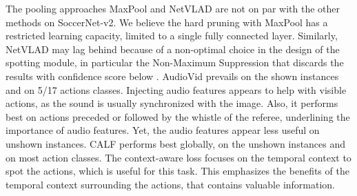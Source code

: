 \documentclass[final]{cvsports}
\begin{document}
The pooling approaches MaxPool and NetVLAD are not on par with the other methods on SoccerNet-v2. We believe the hard pruning with MaxPool has a restricted learning capacity, limited to a single fully connected layer. Similarly, NetVLAD may lag behind because of a non-optimal choice in the design of the spotting module, in particular the Non-Maximum Suppression that discards the results with confidence score below . AudioVid prevails on the shown instances and on 5/17 actions classes. Injecting audio features appears to help with visible actions, as the sound is usually synchronized with the image. Also, it performs best on actions preceded or followed by the whistle of the referee, underlining the importance of audio features. Yet, the audio features appear less useful on unshown instances. 
CALF performs best globally, on the unshown instances and on most action classes. The context-aware loss focuses on the temporal context to spot the actions, which is useful for this task. This emphasizes the benefits of the temporal context surrounding the actions, that contains valuable information.
\end{document}

